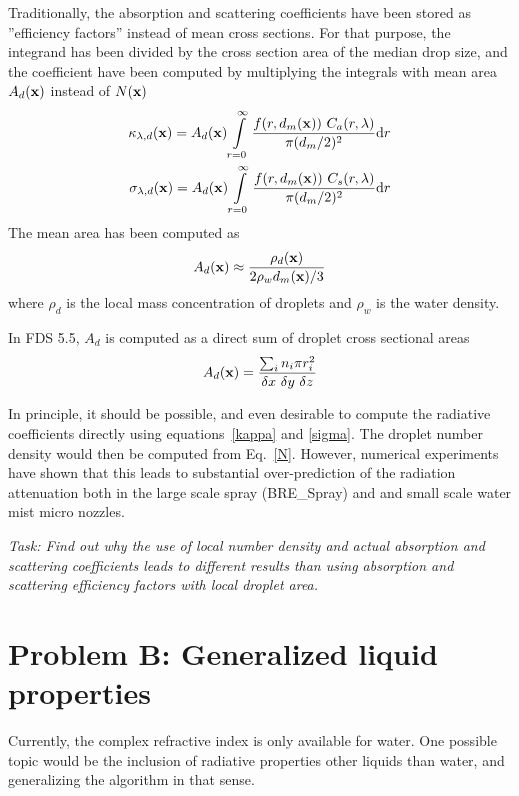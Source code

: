 \documentclass[12pt]{article}
\newcommand{\bx}{{\bf x}}
\begin{document}
Traditionally, the absorption and scattering coefficients have been stored as ''efficiency factors'' instead
of mean cross sections. For that purpose, the integrand has been divided by the cross section area of the median drop size, and the
coefficient have been computed by multiplying the integrals with mean area $A_d(\bx)$ instead of $N(\bx)$
\begin{eqnarray}
\kappa_{\lambda,d}(\bx) = A_d(\bx) \int\limits_{r=0}^{\infty}\frac{f(r,d_{m}(\bx))~C_{a}(r,\lambda)}{\pi (d_m/2)^2}\textrm{d}r\\
\sigma_{\lambda,d}(\bx) = A_d(\bx) \int\limits_{r=0}^{\infty}\frac{f(r,d_{m}(\bx))~C_{s}(r,\lambda)}{\pi (d_m/2)^2}\textrm{d}r
\end{eqnarray}
The mean area has been computed as 
\begin{equation}
A_d(\bx)\approx \frac{\rho_d(\bx)}{2\rho_w d_m(\bx)/3}
\end{equation}
where $\rho_d$ is the local mass concentration of droplets and $\rho_w$ is the water density.

In FDS 5.5, $A_d$ is computed as a direct sum of droplet cross sectional areas
\begin{equation}
A_d(\bx)    =  \frac{\sum_i n_i \pi r_i^2 }{\delta x~\delta y~\delta z}
\end{equation}

In principle, it should be possible, and even desirable to compute the radiative coefficients directly using equations~\ref{kappa} and \ref{sigma}.
The droplet number density would then be computed from Eq.~\ref{N}. However, numerical experiments have shown that this leads to substantial over-prediction
of the radiation attenuation both in the large scale spray (BRE\_Spray) and and small scale water mist micro nozzles.
\newline

{\em Task: Find out why the use of local number density and actual absorption and scattering coefficients leads to different results than
using absorption and scattering efficiency factors with local droplet area.}


\section{Problem B: Generalized liquid properties}

Currently, the complex refractive index is only available for water. One possible topic would be the inclusion of radiative properties 
other liquids than water, and generalizing the algorithm in that sense. 
\end{document}
